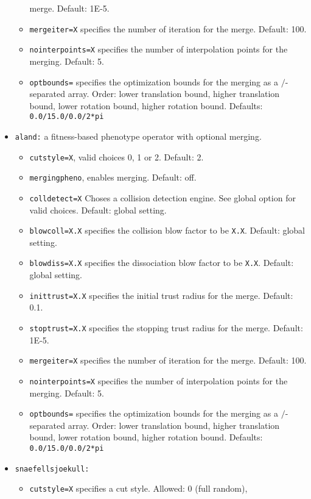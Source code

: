 \documentclass[a4paper,10pt]{scrbook}
\begin{document}
\begin{itemize}
\begin{itemize}
merge. Default: 1E-5.
    \item \texttt{mergeiter=X} specifies the number of iteration for the merge. 
Default: 100.
    \item \texttt{nointerpoints=X} specifies the number of interpolation points 
for the merging. Default: 5.
    \item \texttt{optbounds=} specifies the optimization bounds for the merging 
as a $/$-separated array. Order: lower translation bound, higher translation 
bound, lower rotation bound, higher rotation bound. Defaults: 
\texttt{0.0/15.0/0.0/2*pi}
  \end{itemize}
  \item \texttt{aland:} a fitness-based phenotype operator with optional 
merging.
  \begin{itemize}
    \item \texttt{cutstyle=X}, valid choices 0, 1 or 2. Default: 2.
    \item \texttt{mergingpheno}, enables merging. Default: off.
    \item \texttt{colldetect=X} Choses a collision detection engine. See global 
option for valid choices. Default: global setting.
    \item \texttt{blowcoll=X.X} specifies the collision blow factor to be 
\texttt{X.X}. Default: global setting.
    \item \texttt{blowdiss=X.X} specifies the dissociation blow factor to be 
\texttt{X.X}. Default: global setting.
    \item \texttt{inittrust=X.X} specifies the initial trust radius for the 
merge. Default: 0.1.
    \item \texttt{stoptrust=X.X} specifies the stopping trust radius for the 
merge. Default: 1E-5.
    \item \texttt{mergeiter=X} specifies the number of iteration for the merge. 
Default: 100.
    \item \texttt{nointerpoints=X} specifies the number of interpolation points 
for the merging. Default: 5.
    \item \texttt{optbounds=} specifies the optimization bounds for the merging 
as a $/$-separated array. Order: lower translation bound, higher translation 
bound, lower rotation bound, higher rotation bound. Defaults: 
\texttt{0.0/15.0/0.0/2*pi}
  \end{itemize}
  \item \texttt{snaefellsjoekull:}
  \begin{itemize}
    \item \texttt{cutstyle=X} specifies a cut style. Allowed: 0 (full random), 

\end{itemize}
\end{itemize}
\end{document}
